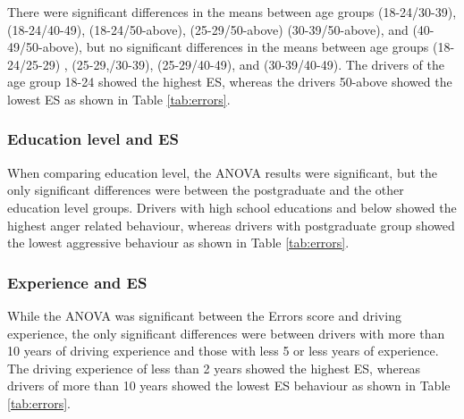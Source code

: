 \documentclass[preprint,12pt,a4paper,authoryear]{elsarticle}
\begin{document}
There were significant differences in the means between age groups (18-24/30-39), (18-24/40-49),  (18-24/50-above), (25-29/50-above) (30-39/50-above), and (40-49/50-above), but no significant differences in the means between age groups (18-24/25-29) , (25-29,/30-39), (25-29/40-49), and (30-39/40-49). The drivers of the age group 18-24 showed the highest ES, whereas the drivers 50-above showed the lowest ES as shown in Table \ref{tab:errors}.

\subsubsection{Education level and ES}

When comparing education level, the ANOVA results were significant, but the only significant differences were between the postgraduate and the other education level groups. Drivers with high school educations and below showed the highest anger related behaviour, whereas drivers with postgraduate group showed the lowest aggressive behaviour as shown in Table \ref{tab:errors}.

\subsubsection{Experience and ES}

While the ANOVA was significant between the Errors score and driving experience, the only significant differences were between drivers with more than 10 years of driving experience and those with less 5 or less years of experience. The driving experience of less than 2 years showed the highest ES, whereas  drivers of more than 10 years showed the lowest ES behaviour  as shown in Table \ref{tab:errors}.
\end{document}
